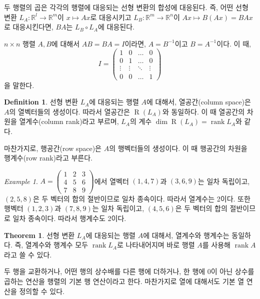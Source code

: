 \documentclass[unfonts,oneside,a4paper]{oblivoir}
\theoremstyle{definition}
\newtheorem{definition}{Definition}
\theoremstyle{theorem}
\newtheorem{theorem}{Theorem}
\theoremstyle{remark}
\theoremstyle{remark}
\theoremstyle{remark}
\newtheorem*{example}{Example}
\theoremstyle{remark}
\renewcommand{\vec}[1]{\bm{\mathit{#1}}}
\DeclareMathOperator{\Range}{R}
\DeclareMathOperator{\rank}{rank}
\begin{document}
두 행렬의 곱은 각각의 행렬에 대응되는 선형 변환의 합성에 대응된다.
즉, 어떤 선형 변환 $L_A: \mathbb R^l \rightarrow \mathbb R^m$이 $\vec x \mapsto A \vec x$로 대응시키고 $L_B: \mathbb R^m \rightarrow \mathbb R^n$이 $A \vec x \mapsto B(A \vec x) = BA \vec x$로 대응시킨다면, $BA$는 $L_B \circ L_A$에 대응된다.

$n \times n$ 행렬 $A, B$에 대해서 $AB = BA = I$이라면, $A = B^{-1}$이고 $B = A^{-1}$이다.
이 때,
\begin{equation*}
    I = \begin{pmatrix}
        1 & 0 & \dots & 0\\
        0 & 1 & \dots & 0\\
        \vdots & \vdots & \ddots & \vdots\\
        0 & 0 & \dots & 1
    \end{pmatrix}
\end{equation*}
을 말한다.

\begin{definition}
    선형 변환 $L_A$에 대응되는 행렬 $A$에 대해서, 열공간(column space)은 $A$의 열벡터들의 생성이다.
    따라서 열공간은 $\Range(L_A)$와 동일하다.
    이 때 열공간의 차원을 열계수(column rank)라고 부르며, $L_A$의 계수 $\dim \Range(L_A) = \rank L_A$와 같다.

    마찬가지로, 행공간(row space)은 $A$의 행벡터들의 생성이다.
    이 때 행공간의 차원을 행계수(row rank)라고 부른다.
\end{definition}

\begin{example}
    $A = \begin{pmatrix}
        1 & 2 & 3\\
        4 & 5 & 6\\
        7 & 8 & 9
    \end{pmatrix}$에서 열벡터 $(1, 4, 7)$과 $(3, 6, 9)$는 일차 독립이고, $(2, 5, 8)$은 두 벡터의 합의 절반이므로 일차 종속이다.
    따라서 열계수는 2이다.
    또한 행벡터 $(1, 2, 3)$과 $(7, 8, 9)$는 일차 독립이고, $(4, 5, 6)$은 두 벡터의 합의 절반이므로 일차 종속이다.
    따라서 행계수도 2이다.
\end{example}

\begin{theorem} \label{thm14}
    선형 변환 $L_A$에 대응되는 행렬 $A$에 대해서, 열계수와 행계수는 동일하다.
    즉, 열계수와 행계수 모두 $\rank L_A$로 나타내어지며 바로 행렬 $A$를 사용해 $\rank A$라고 쓸 수 있다.
\end{theorem}

두 행을 교환하거나, 어떤 행의 상수배를 다른 행에 더하거나, 한 행에 0이 아닌 상수를 곱하는 연산을 행렬의 기본 행 연산이라고 한다.
마찬가지로 열에 대해서도 기본 열 연산을 정의할 수 있다.
\end{document}
